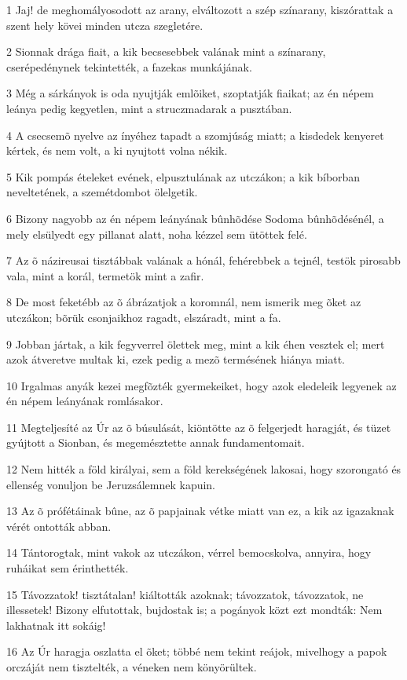 \par 1 Jaj! de meghomályosodott az arany, elváltozott a szép színarany, kiszórattak a szent hely kövei minden utcza szegletére.
\par 2 Sionnak drága fiait, a kik becsesebbek valának mint a színarany, cserépedénynek tekintették, a fazekas munkájának.
\par 3 Még a sárkányok is oda nyujtják emlõiket, szoptatják fiaikat; az én népem leánya pedig kegyetlen, mint a struczmadarak a pusztában.
\par 4 A csecsemõ nyelve az ínyéhez tapadt a szomjúság miatt; a kisdedek kenyeret kértek, és nem volt, a ki nyujtott volna nékik.
\par 5 Kik pompás ételeket evének, elpusztulának az utczákon; a kik bíborban neveltetének, a szemétdombot ölelgetik.
\par 6 Bizony nagyobb az én népem leányának bûnhõdése Sodoma bûnhõdésénél, a mely elsülyedt egy pillanat alatt, noha kézzel sem ütöttek felé.
\par 7 Az õ názireusai tisztábbak valának a hónál, fehérebbek a tejnél, testök pirosabb vala, mint a korál, termetök mint a zafir.
\par 8 De most feketébb az õ ábrázatjok a koromnál, nem ismerik meg õket az utczákon; bõrük csonjaikhoz ragadt, elszáradt, mint a fa.
\par 9 Jobban jártak, a kik fegyverrel ölettek meg, mint a kik éhen vesztek el; mert azok átveretve multak ki, ezek pedig a mezõ termésének hiánya miatt.
\par 10 Irgalmas anyák kezei megfõzték gyermekeiket, hogy azok eledeleik legyenek az én népem leányának romlásakor.
\par 11 Megteljesíté az Úr az õ búsulását, kiöntötte az õ felgerjedt haragját, és tüzet gyújtott a Sionban, és megemésztette annak fundamentomait.
\par 12 Nem hitték a föld királyai, sem a föld kerekségének lakosai, hogy szorongató és ellenség vonuljon be Jeruzsálemnek kapuin.
\par 13 Az õ prófétáinak bûne, az õ papjainak vétke miatt van ez, a kik az igazaknak vérét ontották abban.
\par 14 Tántorogtak, mint vakok az utczákon, vérrel bemocskolva, annyira, hogy ruháikat sem érinthették.
\par 15 Távozzatok! tisztátalan! kiáltották azoknak; távozzatok, távozzatok, ne illessetek! Bizony elfutottak, bujdostak is; a pogányok közt ezt mondták: Nem lakhatnak itt sokáig!
\par 16 Az Úr haragja oszlatta el õket; többé nem tekint reájok, mivelhogy a papok orczáját nem tisztelték, a véneken nem könyörültek.
